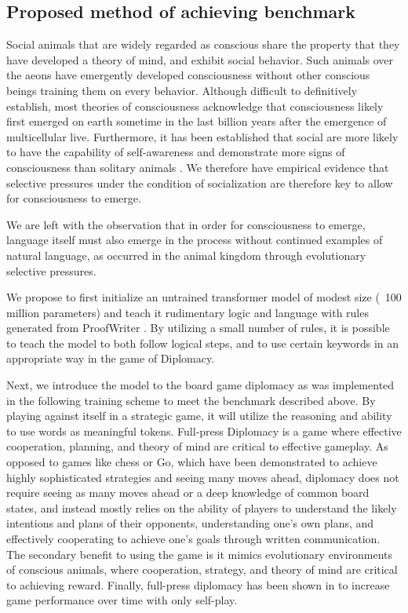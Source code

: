 \documentclass{article}
\begin{document}
\subsection{Proposed method of achieving benchmark}

Social animals that are widely regarded as conscious share the property that they have developed a theory of mind, and exhibit social behavior. Such animals over the aeons have emergently developed consciousness without other conscious beings training them on every behavior. Although difficult to definitively establish, most theories of consciousness acknowledge that consciousness likely first emerged on earth sometime in the last billion years after the emergence of multicellular live. Furthermore, it has been established that social are more likely to have the capability of self-awareness and demonstrate more signs of consciousness than solitary animals \citep{lei2023sociality}.  We therefore have empirical evidence that selective pressures under the condition of socialization are therefore key to allow for consciousness to emerge.

We are left with the observation that in order for consciousness to emerge, language itself must also emerge in the process without continued examples of natural language, as occurred in the animal kingdom through evolutionary selective pressures.

We propose to first initialize an untrained transformer model of modest size (~100 million parameters) and teach it rudimentary logic and language with rules generated from ProofWriter \citep{tafjord2021proofwritergeneratingimplicationsproofs}. By utilizing a small number of rules, it is possible to teach the model to both follow logical steps, and to use certain keywords in an appropriate way in the game of Diplomacy.

Next, we introduce the model to the board game diplomacy as was implemented in \citep{fair2022diplomacy} 
the following training scheme to meet the benchmark described above. By playing against itself in a strategic game, it will utilize the reasoning and ability to use words as meaningful tokens. Full-press Diplomacy is a game where effective cooperation, planning, and theory of mind are critical to effective gameplay. As opposed to games like chess or Go, which have been demonstrated to achieve highly sophisticated strategies and seeing many moves ahead, diplomacy does not require seeing as many moves ahead or a deep knowledge of common board states, and instead mostly relies on the ability of players to understand the likely intentions and plans of their opponents, understanding one's own plans, and effectively cooperating to achieve one's goals through written communication. The secondary benefit to using the game is it mimics evolutionary environments of conscious animals, where cooperation, strategy, and theory of mind are critical to achieving reward. Finally, full-press diplomacy has been shown in \citep{fair2022diplomacy} to increase game performance over time with only self-play.
\end{document}
